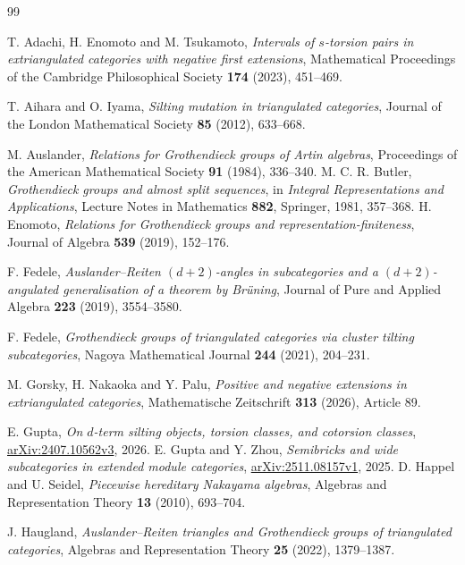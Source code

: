 \documentclass[pdflatex,sn-mathphys-num]{sn-jnl}
\numberwithin{equation}{section}
\theoremstyle{definition}
\theoremstyle{remark}\newtheorem{remark}[theorem]{Remark}
\begin{document}
\begin{thebibliography}{99}
\raggedright
{}
T. Adachi, H. Enomoto and M. Tsukamoto, \emph{Intervals of $s$-torsion
pairs in extriangulated categories with negative first extensions},
Mathematical Proceedings of the Cambridge Philosophical Society
\textbf{174} (2023), 451--469.

T. Aihara and O. Iyama, \emph{Silting mutation in triangulated categories},
Journal of the London Mathematical Society \textbf{85} (2012), 633--668.

M. Auslander, \emph{Relations for Grothendieck groups of Artin algebras},
Proceedings of the American Mathematical Society \textbf{91} (1984),
336--340.
M. C. R. Butler, \emph{Grothendieck groups and almost split sequences},
in \emph{Integral Representations and Applications}, Lecture Notes in
Mathematics \textbf{882}, Springer, 1981, 357--368.
H. Enomoto, \emph{Relations for Grothendieck groups and
representation-finiteness}, Journal of Algebra \textbf{539} (2019),
152--176.

F. Fedele, \emph{Auslander--Reiten $(d+2)$-angles in subcategories and a
$(d+2)$-angulated generalisation of a theorem by Br\"uning}, Journal
of Pure and Applied Algebra \textbf{223} (2019), 3554--3580.

F. Fedele, \emph{Grothendieck groups of triangulated categories via
cluster tilting subcategories}, Nagoya Mathematical Journal
\textbf{244} (2021), 204--231.

M. Gorsky, H. Nakaoka and Y. Palu, \emph{Positive and negative extensions
in extriangulated categories}, Mathematische Zeitschrift \textbf{313}
(2026), Article 89.

E. Gupta, \emph{On $d$-term silting objects, torsion classes, and cotorsion
classes}, \href{https://arxiv.org/abs/2407.10562v3}{arXiv:2407.10562v3}, 2026.
E. Gupta and Y. Zhou, \emph{Semibricks and wide subcategories in extended
module categories}, \href{https://arxiv.org/abs/2511.08157v1}{arXiv:2511.08157v1}, 2025.
D. Happel and U. Seidel, \emph{Piecewise hereditary Nakayama algebras},
Algebras and Representation Theory \textbf{13} (2010), 693--704.

J. Haugland, \emph{Auslander--Reiten triangles and Grothendieck groups of
triangulated categories}, Algebras and Representation Theory
\textbf{25} (2022), 1379--1387.


\end{thebibliography}
\end{document}
